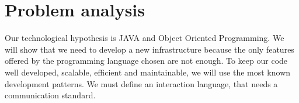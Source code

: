 \section{Problem analysis}
Our technological hypothesis is JAVA and Object Oriented Programming. We
will show that we need to develop a new infrastructure because the only features
offered by the programming language chosen are not enough. To keep our code
well developed, scalable, efficient and maintainable, we will use the most known
development patterns. We must define an interaction language, that needs a
communication standard.


